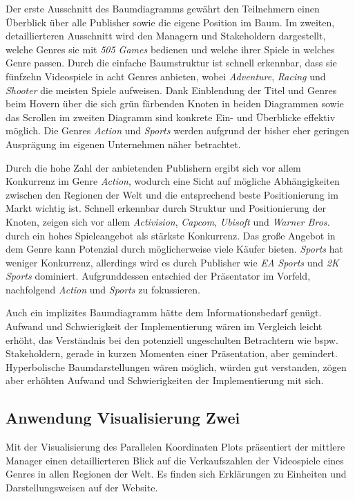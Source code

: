 \documentclass[usegeometry=true]{scrartcl}
\begin{document}
Der erste Ausschnitt des Baumdiagramms gewährt den Teilnehmern einen Überblick über alle Publisher sowie die eigene Position im Baum.
Im zweiten, detaillierteren Ausschnitt wird den Managern und Stakeholdern dargestellt, welche Genres sie mit \textit{505 Games} bedienen und welche ihrer Spiele in welches Genre passen.
Durch die einfache Baumstruktur ist schnell erkennbar, dass sie fünfzehn Videospiele in acht Genres anbieten, wobei \textit{Adventure}, \textit{Racing} und \textit{Shooter} die meisten Spiele aufweisen.
Dank Einblendung der Titel und Genres beim Hovern über die sich grün färbenden Knoten in beiden Diagrammen sowie das Scrollen im zweiten Diagramm sind konkrete Ein- und Überblicke effektiv möglich. 
Die Genres \textit{Action} und \textit{Sports} werden aufgrund der bisher eher geringen Ausprägung im eigenen Unternehmen näher betrachtet. 

Durch die hohe Zahl der anbietenden Publishern ergibt sich vor allem Konkurrenz im Genre \textit{Action}, wodurch eine Sicht auf mögliche Abhängigkeiten zwischen den Regionen der Welt und die entsprechend beste Positionierung im Markt wichtig ist.
Schnell erkennbar durch Struktur und Positionierung der Knoten, zeigen sich vor allem \textit{Activision}, \textit{Capcom}, \textit{Ubisoft} und \textit{Warner Bros.} durch ein hohes Spieleangebot als stärkste Konkurrenz. 
Das große Angebot in dem Genre kann Potenzial durch möglicherweise viele Käufer bieten.
\textit{Sports} hat weniger Konkurrenz, allerdings wird es durch Publisher wie \textit{EA Sports} und \textit{2K Sports} dominiert.
Aufgrunddessen entschied der Präsentator im Vorfeld, nachfolgend \textit{Action} und \textit{Sports} zu fokussieren.

Auch ein implizites Baumdiagramm hätte dem Informationsbedarf genügt. 
Aufwand und Schwierigkeit der Implementierung wären im Vergleich leicht erhöht, das Verständnis bei den potenziell ungeschulten Betrachtern wie bspw. Stakeholdern, gerade in kurzen Momenten einer Präsentation, aber gemindert. 
Hyperbolische Baumdarstellungen wären möglich, würden gut verstanden, zögen aber erhöhten Aufwand und Schwierigkeiten der Implementierung mit sich. 

\subsection{Anwendung Visualisierung Zwei}
Mit der Visualisierung des Parallelen Koordinaten Plots präsentiert der mittlere Manager einen detaillierteren Blick auf die Verkaufszahlen der Videospiele eines Genres in allen Regionen der Welt.
Es finden sich Erklärungen zu Einheiten und Darstellungsweisen auf der Website.
\end{document}
